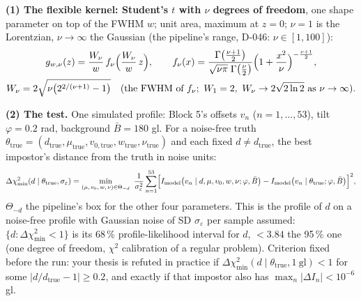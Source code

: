 \documentclass[11pt,varwidth=17.6cm,border=14pt]{standalone}
\newcommand{\Imod}{I_{\mathrm{model}}}
\begin{document}
\textbf{(1) The flexible kernel: Student's $t$ with $\nu$ degrees of freedom}, one shape parameter on top of the FWHM $w$; unit area, maximum at $z=0$; $\nu=1$ is the Lorentzian, $\nu\to\infty$ the Gaussian (the pipeline's range, D-046: $\nu\in[1,100]$):
\begin{gather*}
g_{w,\nu}(z)=\frac{W_\nu}{w}\,f_\nu\Bigl(\frac{W_\nu}{w}\,z\Bigr),\qquad
f_\nu(x)=\frac{\Gamma\bigl(\tfrac{\nu+1}{2}\bigr)}{\sqrt{\nu\pi}\;\Gamma\bigl(\tfrac{\nu}{2}\bigr)}\Bigl(1+\frac{x^{2}}{\nu}\Bigr)^{-\frac{\nu+1}{2}},\\
W_\nu=2\sqrt{\nu\bigl(2^{2/(\nu+1)}-1\bigr)}\quad(\text{the FWHM of } f_\nu;\ W_1=2,\ W_\nu\to2\sqrt{2\ln2}\ \text{as}\ \nu\to\infty).
\end{gather*}

\medskip
\textbf{(2) The test.} One simulated profile: Block 5's offsets $v_n$ ($n=1,\dots,53$), tilt $\varphi=0.2$ rad, background $\bar B=180$ gl. For a noise-free truth $\theta_{\mathrm{true}}=(d_{\mathrm{true}},\mu_{\mathrm{true}},v_{0,\mathrm{true}},w_{\mathrm{true}},\nu_{\mathrm{true}})$ and each fixed $d\neq d_{\mathrm{true}}$, the best impostor's distance from the truth in noise units:
\begin{equation*}
\Delta\chi^2_{\min}(d\mid\theta_{\mathrm{true}},\sigma_\varepsilon)=\min_{(\mu,\,v_0,\,w,\,\nu)\in\Theta_{-d}}\ \frac{1}{\sigma_\varepsilon^{2}}\sum_{n=1}^{53}\Bigl[\Imod\bigl(v_n\mid d,\mu,v_0,w,\nu;\varphi,\bar B\bigr)-\Imod\bigl(v_n\mid\theta_{\mathrm{true}};\varphi,\bar B\bigr)\Bigr]^{2},
\end{equation*}
$\Theta_{-d}$ the pipeline's box for the other four parameters. This is the profile of $d$ on a noise-free profile with Gaussian noise of SD $\sigma_\varepsilon$ per sample assumed: $\{d:\Delta\chi^2_{\min}<1\}$ is its 68\,\% profile-likelihood interval for $d$, $<3.84$ the 95\,\% one (one degree of freedom, $\chi^2$ calibration of a regular problem). Criterion fixed before the run: your thesis is refuted in practice if $\Delta\chi^2_{\min}(d\mid\theta_{\mathrm{true}},1\ \mathrm{gl})<1$ for some $\lvert d/d_{\mathrm{true}}-1\rvert\ge0.2$, and exactly if that impostor also has $\max_n\lvert\Delta I_n\rvert<10^{-6}$ gl.
\end{document}
